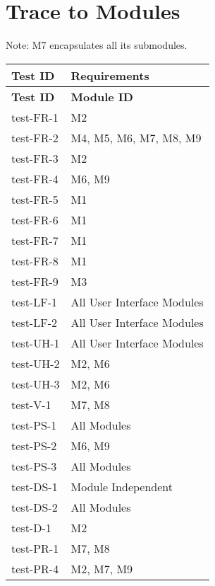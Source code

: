 \documentclass[12pt, titlepage]{article}
\begin{document}
\section{Trace to Modules}	
Note: M7 encapsulates all its submodules.
\begin{center}
    \begin{longtable}{|>{\centering\arraybackslash}p{4cm}|>{\centering\arraybackslash}p{10cm}|}
    \hline
    \textbf{Test ID} & \textbf{Requirements} \\
    \hline
    \endfirsthead
    
    \hline
    \textbf{Test ID} & \textbf{Module ID} \\
    \hline
    \endhead
    
    test-FR-1 &  M2\\
    \hline
    test-FR-2 & M4, M5, M6, M7, M8, M9\\
    \hline
    test-FR-3 & M2 \\
    \hline
    test-FR-4 & M6, M9 \\
    \hline
    test-FR-5 & M1 \\
    \hline
    test-FR-6 & M1 \\
    \hline
    test-FR-7 & M1 \\
    \hline
    test-FR-8 & M1 \\
    \hline
    test-FR-9 & M3 \\
    \hline
    test-LF-1 & All User Interface Modules \\
    \hline
    test-LF-2 & All User Interface Modules \\
    \hline
    test-UH-1 & All User Interface Modules \\
    \hline
    test-UH-2 & M2, M6 \\
    \hline
    test-UH-3 & M2, M6 \\
    \hline
    test-V-1 &  M7, M8 \\
    \hline
    test-PS-1 &  All Modules\\
    \hline
    test-PS-2 &  M6, M9 \\
    \hline
    test-PS-3 & All Modules \\
    \hline
    test-DS-1 &  Module Independent\\
    \hline
    test-DS-2 & All Modules\\
    \hline
    test-D-1 & M2\\
    \hline
    test-PR-1 &  M7, M8\\
    \hline
    test-PR-4 &  M2, M7, M9\\
    \hline

\end{longtable}
\end{center}
\end{document}
